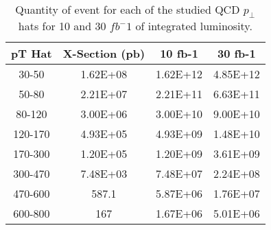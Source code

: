 \begin{table}
\centering

\begin{tabular}{|c|c|c|c|}
\hline
pT Hat &  X-Section (pb) &  10 fb-1 & 30 fb-1 \\
\hline
\hline
  30-50 & \num{1.62E+08} & \num{1.62E+12} & \num{4.85E+12} \\
  50-80 & \num{2.21E+07} & \num{2.21E+11} & \num{6.63E+11} \\
 80-120 & \num{3.00E+06} & \num{3.00E+10} & \num{9.00E+10} \\
120-170 & \num{4.93E+05} & \num{4.93E+09} & \num{1.48E+10} \\
170-300 & \num{1.20E+05} & \num{1.20E+09} & \num{3.61E+09} \\
300-470 & \num{7.48E+03} & \num{7.48E+07} & \num{2.24E+08} \\
470-600 &          587.1 & \num{5.87E+06} & \num{1.76E+07} \\
600-800 &            167 & \num{1.67E+06} & \num{5.01E+06} \\
\hline
\end{tabular}


\caption{Quantity of event for each of the studied QCD $p_\perp$ hats for 10 and 30 $fb^-1$ of integrated luminosity.}
\label{table_QCD_RunII_EventsIntegratedLuminsity}
\end{table} 
